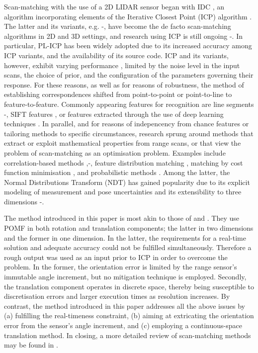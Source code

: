 Scan-matching with the use of a 2D LIDAR sensor began with IDC \cite{LuMilios},
an algorithm incorporating elements of the Iterative Closest Point (ICP)
algorithm \cite{ICP}. The latter and its variants, e.g.
\cite{weighted}-\cite{plicp}, have become the de facto scan-matching algorithms
in 2D and 3D settings, and research using ICP is still ongoing
\cite{ICP_var_1}-\cite{Marchel}. In particular, PL-ICP \cite{plicp} has been
widely adopted due to its increased accuracy among ICP variants, and the
availability of its source code. ICP and its variants, however, exhibit varying
performance \cite{icp_comp_trade}, limited by the noise level in the input
scans, the choice of prior, and the configuration of the parameters
governing their response. For these reasons, as well as for reasons of
robustness, the method of establishing correspondences shifted from
point-to-point or point-to-line to feature-to-feature. Commonly appearing
features for recognition are line segments \cite{CLS}-\cite{Wen},
SIFT features \cite{Jiayuan}, or features extracted through the use of deep
learning techniques \cite{Jiaxin}. In parallel, and for reasons of
indepencency from chance features or tailoring methods to specific
circumstances, research sprung around methods that extract or exploit
mathematical properties from range scans, or that view the problem of
scan-matching as an optimisation problem. Examples include correlation-based
methods \cite{olson},\cite{olson_2015}-\cite{Konecny}, feature distribution
matching \cite{HSM}, matching by cost function minimisation \cite{PB_PSM}, and
probabilistic methods \cite{pIC}\cite{gpm}. Among the latter, the Normal
Distributions Transform (NDT) \cite{ndt1} has gained popularity due to its
explicit modeling of measurement and pose uncertainties and its extensibility
to three dimensions \cite{ndt2}-\cite{ndt6}.

The method introduced in this paper is most akin to those of \cite{Heng} and
\cite{Jiang}. They use POMF \cite{fmt2d} in both rotation and translation
components; the latter in two dimensions and the former in one dimension. In
the latter, the requirements for a real-time solution and adequate accuracy
could not be fulfilled simultaneously. Therefore a rough output was used as an
input prior to ICP in order to overcome the problem. In the former, the
orientation error is limited by the range sensor's immutable angle increment,
but no mitigation technique is employed. Secondly, the translation component
operates in discrete space, thereby being susceptible to discretisation errors
and larger execution times as resolution increases. By contrast, the method
introduced in this paper addresses all the above issues by (a) fulfilling the
real-timeness constraint, (b) aiming at extricating the orientation error from
the sensor's angle increment, and (c) employing a continuous-space translation
method. In closing, a more detailed review of scan-matching methods may be
found in \cite{pose_selection}.
